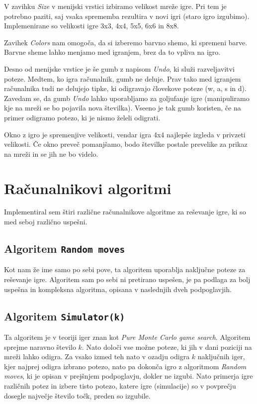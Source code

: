 \documentclass{article}
\begin{document}
V zavihku \emph{Size} v menijski vrstici izbiramo velikost mreže igre. Pri tem je potrebno paziti, saj vsaka sprememba rezultira v novi igri (staro igro izgubimo). Implemenirane so velikosti igre 3x3, 4x4, 5x5, 6x6 in 8x8.

Zavihek \emph{Colors} nam omogoča, da si izberemo barvno shemo, ki spremeni barve. Barvne sheme lahko menjamo med igranjem, brez da to vpliva na igro.

Desno od menijske vrstice je še gumb z napisom \emph{Undo}, ki služi razveljavitvi poteze. Medtem, ko igra računalnik, gumb ne deluje. Prav tako med igranjem računalnika tudi ne delujejo tipke, ki odigravajo človekove poteze (w, a, s in d). Zavedam se, da gumb \emph{Undo} lahko uporabljamo za goljufanje igre (manipuliramo kje na mreži se bo pojavila nova številka). Vseeno je tak gumb koristen, če na primer odigramo potezo, ki je nismo želeli odigrati.

Okno z igro je spremenjive velikosti, vendar igra 4x4 najlepše izgleda v privzeti velikosti. Če okno preveč pomanjšamo, bodo številke postale prevelike za prikaz na mreži in se jih ne bo videlo.

\section{Računalnikovi algoritmi}

Implementiral sem štiri različne računalnikove algoritme za reševanje igre, ki so med seboj različno uspešni.

\subsection{Algoritem \texttt{Random moves}}

Kot nam že ime samo po sebi pove, ta algoritem uporablja naključne poteze za reševanje igre. Algoritem sam po sebi ni pretirano uspešen, je pa podlaga za bolj uspešna in kompleksna algoritma, opisana v naslednjih dveh podpoglavjih.

\subsection{Algoritem \texttt{Simulator(k)}}

Ta algoritem je v teoriji iger znan kot \emph{Pure Monte Carlo game search}. Algoritem sprejme naravno število $k$. Nato določi vse možne poteze, ki jih v dani poziciji na mreži lahko odigra. Za vsako izmed teh nato v ozadju odigra $k$ naključnih iger, kjer najprej odigra izbrano potezo, nato pa dokonča igro z algoritmom \emph{Random moves}, ki je opisan v prejšnjem podpoglavju, dokler ne izgubi. Nato primerja igre različnih potez in izbere tisto potezo, katere igre (simulacije) so v povprečju dosegle največje število točk, preden so izgubile.
\end{document}
